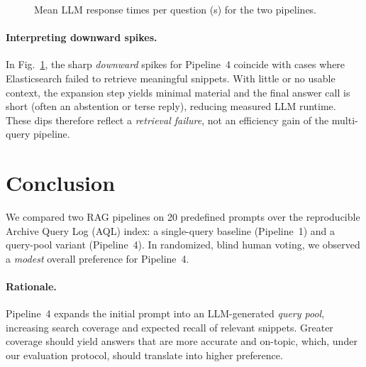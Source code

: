\documentclass[manuscript,screen]{acmart}
\begin{document}
\begin{CCSXML}
\begin{figure}[H]
\caption{Mean LLM response times per question (s) for the two pipelines.}
\label{fig:time-per-question}
\end{figure}

\paragraph{Interpreting downward spikes.}
In Fig.~\ref{fig:time-per-question}, the sharp \emph{downward} spikes for
Pipeline~4 coincide with cases where Elasticsearch failed to retrieve
meaningful snippets. With little or no usable context, the expansion step
yields minimal material and the final answer call is short (often an abstention
or terse reply), reducing measured LLM runtime. These dips therefore reflect a
\emph{retrieval failure}, not an efficiency gain of the multi-query
pipeline.

\section{Conclusion}
\label{sec:conclusion}

We compared two RAG pipelines on 20 predefined prompts over the reproducible
Archive Query Log (AQL) index: a single-query baseline (Pipeline~1) and a
query-pool variant (Pipeline~4). In randomized, blind human voting, we observed
a \emph{modest} overall preference for Pipeline~4. 

\paragraph{Rationale.}
Pipeline~4 expands the initial prompt into an LLM-generated \emph{query pool}, 
increasing search coverage and expected recall of relevant snippets. Greater coverage 
should yield answers that are more accurate and on-topic, which, under our evaluation protocol, 
should translate into higher preference.


\end{CCSXML}
\end{document}
